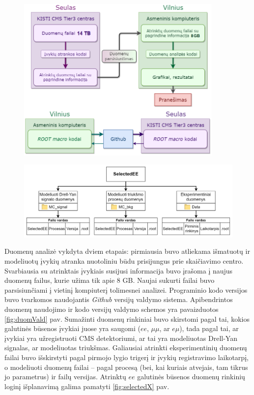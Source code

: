 \documentclass[a4paper, 12pt, oneside]{article}
\newcommand{\emu}{e\mu}
\begin{document}
\begin{figure}[H]
	\includegraphics[width=0.9\textwidth]{Duomenu_panaudojimo_schema.png}
\end{figure}

\begin{figure}[H]
	\includegraphics[width=\textwidth]{atrinktu_duomenu_schema_v1.png}
\end{figure}

Duomenų analizė vykdyta dviem etapais: pirmiausia buvo atliekama išmatuotų ir modeliuotų įvykių atranka nuotoliniu
būdu prisijungus prie skaičiavimo centro.
Svarbiausia su atrinktais įvykiais susijusi informacija buvo įrašoma į naujus duomenų failus, kurie užima tik
apie $8$ GB.
Naujai sukurti failai buvo parsisiunčiami į vietinį kompiuterį tolimesnei analizei.
Programinio kodo versijos buvo tvarkomos naudojantis \textit{Github} versijų valdymo sistema.
Apibendrintos duomenų naudojimo ir kodo versijų valdymo schemos yra pavaizduotos \ref{fig:duomVald} pav.
Sumažinti duomenų rinkiniai buvo skirstomi pagal tai, kokios galutinės būsenos įvykiai juose yra saugomi
($ee$, $\mu\mu$, ar $\emu$), tada pagal tai, ar įvykiai yra užregistruoti CMS detektoriumi, ar tai yra modeliuotas
Drell-Yan signalas, ar modeliuotas triukšmas.
Galiausiai atrinkti eksperimentinių duomenų failai buvo išskirstyti pagal pirmojo lygio trigerį ir įvykių
registravimo laikotarpį, o modeliuoti duomenų failai -- pagal procesą (bei, kai kuriais atvejais, tam tikrus
jo parametrus) ir failų versijas.
Atrinktų $ee$ galutinės būsenos duomenų rinkinių loginį išplanavimą galima pamatyti \ref{fig:selectedX} pav.
\end{document}
